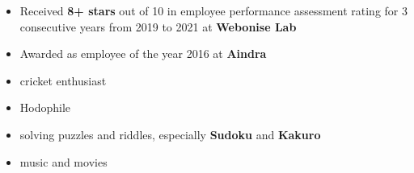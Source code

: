 \documentclass[10pt,a4paper,ragged2e,withhyper]{altacv}
\begin{document}
\begin{paracol}{2}

{}

\vspace{2in}



\divider




\begin{itemize}
    \item Received \textbf{8+ stars} out of 10 in employee performance assessment rating for 3 consecutive years from 2019 to 2021 at \textbf{Webonise Lab}
    \item Awarded as employee of the year 2016 at \textbf{Aindra}
\end{itemize}

\begin{itemize}
    \item cricket enthusiast
    \item Hodophile
    \item solving puzzles and riddles, especially \textbf{Sudoku} and \textbf{Kakuro}
    \item music and movies
\end{itemize}


\newpage





\end{paracol}
\end{document}
